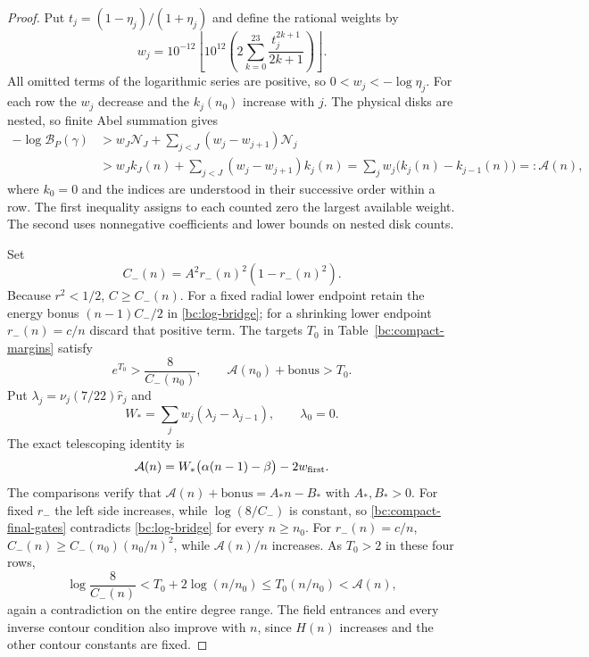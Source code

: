 \documentclass[11pt,reqno]{amsart}
\numberwithin{equation}{section}
\theoremstyle{definition}
\theoremstyle{remark}
\begin{document}
\begin{proof}
Put $t_j=(1-\eta_j)/(1+\eta_j)$ and define the rational weights by
\begin{equation}\label{bc:weights}
 w_j=10^{-12}\left\lfloor10^{12}
       \left(2\sum_{k=0}^{23}\frac{t_j^{2k+1}}{2k+1}\right)
       \right\rfloor.
\end{equation}
All omitted terms of the logarithmic series are positive, so
$0<w_j<-\log\eta_j$.
For each row the $w_j$ decrease and the $k_j(n_0)$ increase with $j$.
The physical disks are nested, so finite Abel summation gives
\begin{align}
 -\log\mathcal B_P(\gamma)
 &>w_J\mathcal N_J+
         \sum_{j<J}(w_j-w_{j+1})\mathcal N_j\nonumber\\
 &>w_Jk_J(n)+
         \sum_{j<J}(w_j-w_{j+1})k_j(n)
   =\sum_jw_j\bigl(k_j(n)-k_{j-1}(n)\bigr)
   =:\mathcal A(n),                               \label{bc:Abel}
\end{align}
where $k_0=0$ and the indices are understood in their successive
order within a row.  The first inequality assigns to each counted
zero the largest available weight.  The second uses nonnegative
coefficients and lower bounds on nested disk counts.

Set
\[
 C_-(n)=A^2r_-(n)^2(1-r_-(n)^2).
\]
Because $r^2<1/2$, $C\geq C_-(n)$.
For a fixed radial lower endpoint retain the energy bonus
$(n-1)C_-/2$ in \eqref{bc:log-bridge}; for a shrinking lower
endpoint $r_-(n)=c/n$ discard that positive term.
The targets $T_0$ in Table~\ref{bc:compact-margins} satisfy
\begin{equation}\label{bc:compact-final-gates}
 e^{T_0}>\frac8{C_-(n_0)},\qquad
 \mathcal A(n_0)+\text{bonus}>T_0.
\end{equation}
Put $\lambda_j=\nu_j(7/22)\widehat r_j$ and
\[
 W_*=\sum_jw_j(\lambda_j-\lambda_{j-1}),\qquad\lambda_0=0.
\]
The exact telescoping identity is
\[
 \mathcal A(n)=W_*\bigl(\alpha(n-1)-\beta\bigr)-2w_{\rm first}.
\]
The comparisons verify that $\mathcal A(n)+\text{bonus}=A_*n-B_*$
with $A_*,B_*>0$.
For fixed $r_-$ the left side increases, while $\log(8/C_-)$ is
constant, so \eqref{bc:compact-final-gates} contradicts
\eqref{bc:log-bridge} for every $n\geq n_0$.
For $r_-(n)=c/n$,
$C_-(n)\geq C_-(n_0)(n_0/n)^2$, while $\mathcal A(n)/n$
increases.  As $T_0>2$ in these four rows,
\[
 \log\frac8{C_-(n)}
 <T_0+2\log(n/n_0)
 \leq T_0(n/n_0)<\mathcal A(n),
\]
again a contradiction on the entire degree range.
The field entrances and every inverse contour condition also improve
with $n$, since $H(n)$ increases and the other contour constants are
fixed.


\end{proof}
\end{document}
